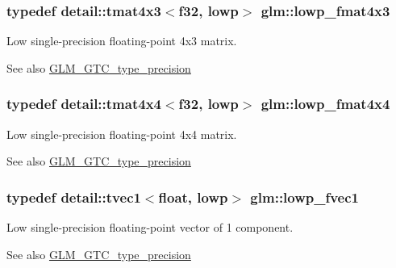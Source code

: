 \subsubsection[{\texorpdfstring{lowp\+\_\+fmat4x3}{lowp_fmat4x3}}]{\setlength{\rightskip}{0pt plus 5cm}typedef detail\+::tmat4x3$<$f32, lowp$>$ {\bf glm\+::lowp\+\_\+fmat4x3}}\hypertarget{group__gtc__type__precision_gaa4df4f3adcc8eb3bed680b14a87fb2c4}{}\label{group__gtc__type__precision_gaa4df4f3adcc8eb3bed680b14a87fb2c4}
Low single-\/precision floating-\/point 4x3 matrix. \begin{DoxySeeAlso}{See also}
\hyperlink{group__gtc__type__precision}{G\+L\+M\+\_\+\+G\+T\+C\+\_\+type\+\_\+precision} 
\end{DoxySeeAlso}
\subsubsection[{\texorpdfstring{lowp\+\_\+fmat4x4}{lowp_fmat4x4}}]{\setlength{\rightskip}{0pt plus 5cm}typedef detail\+::tmat4x4$<$f32, lowp$>$ {\bf glm\+::lowp\+\_\+fmat4x4}}\hypertarget{group__gtc__type__precision_ga9ff955b170643f547661d2e7263ee426}{}\label{group__gtc__type__precision_ga9ff955b170643f547661d2e7263ee426}
Low single-\/precision floating-\/point 4x4 matrix. \begin{DoxySeeAlso}{See also}
\hyperlink{group__gtc__type__precision}{G\+L\+M\+\_\+\+G\+T\+C\+\_\+type\+\_\+precision} 
\end{DoxySeeAlso}
\subsubsection[{\texorpdfstring{lowp\+\_\+fvec1}{lowp_fvec1}}]{\setlength{\rightskip}{0pt plus 5cm}typedef detail\+::tvec1$<$float, lowp$>$ {\bf glm\+::lowp\+\_\+fvec1}}\hypertarget{group__gtc__type__precision_gad5266f0507395cf8cdfe84b9cf5496e4}{}\label{group__gtc__type__precision_gad5266f0507395cf8cdfe84b9cf5496e4}
Low single-\/precision floating-\/point vector of 1 component. \begin{DoxySeeAlso}{See also}
\hyperlink{group__gtc__type__precision}{G\+L\+M\+\_\+\+G\+T\+C\+\_\+type\+\_\+precision} 
\end{DoxySeeAlso}
